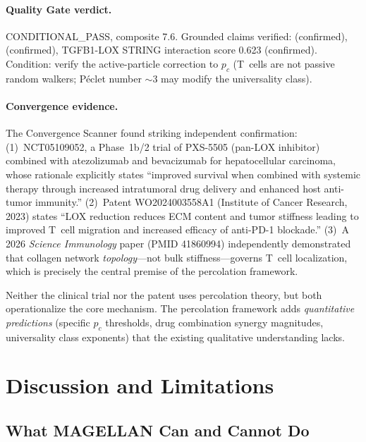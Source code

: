 \paragraph{Quality Gate verdict.} CONDITIONAL\_PASS, composite 7.6. Grounded claims verified: \citet{weinrib1983} (confirmed), \citet{nicolasboluda2021} (confirmed), TGFB1-LOX STRING interaction score 0.623 (confirmed). Condition: verify the active-particle correction to $p_c$ (T~cells are not passive random walkers; P\'{e}clet number $\sim$3 may modify the universality class).

\paragraph{Convergence evidence.} The Convergence Scanner found striking independent confirmation: (1)~NCT05109052, a Phase~1b/2 trial of PXS-5505 (pan-LOX inhibitor) combined with atezolizumab and bevacizumab for hepatocellular carcinoma, whose rationale explicitly states ``improved survival when combined with systemic therapy through increased intratumoral drug delivery and enhanced host anti-tumor immunity.'' (2)~Patent WO2024003558A1 (Institute of Cancer Research, 2023) states ``LOX reduction reduces ECM content and tumor stiffness leading to improved T~cell migration and increased efficacy of anti-PD-1 blockade.'' (3)~A 2026 \textit{Science Immunology} paper (PMID 41860994) independently demonstrated that collagen network \emph{topology}---not bulk stiffness---governs T~cell localization, which is precisely the central premise of the percolation framework.

Neither the clinical trial nor the patent uses percolation theory, but both operationalize the core mechanism. The percolation framework adds \emph{quantitative predictions} (specific $p_c$ thresholds, drug combination synergy magnitudes, universality class exponents) that the existing qualitative understanding lacks.

\section{Discussion and Limitations}
\label{sec:discussion}

\subsection{What MAGELLAN Can and Cannot Do}

